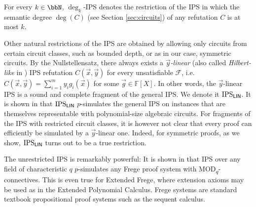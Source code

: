 \documentclass[10pt,a4paper]{article}
\newcommand{\Field}{\ensuremath{\mathbb{F}}}
\newcommand{\F}{\ensuremath{\mathcal{F}}}
\newcommand{\subsc}[1]{\textsubscript{#1}}
\newcommand{\IPSlin}{\text{\upshape IPS}_{\mathsf{LIN}}}
\begin{document}
	For every $k \in \bbN$, $\deg_k$-IPS denotes the restriction of the IPS 
	in which the semantic degree $\deg(C)$ (see Section \ref{sec:circuits}) of any refutation $C$ is at most $k$. %
	
	Other natural restrictions of the IPS are obtained by allowing only circuits from certain circuit classes, such as bounded depth, or as in our case, symmetric circuits.
	By the Nullstellensatz, there always exists a \textit{$\vec y$-linear} (also called 
	\textit{Hilbert-like} in \cite{IPS}) IPS refutation
	$C(\vec x, \vec y)$ for every unsatisfiable $\F$, i.e.\ 
	$
	C(\vec x, \vec y) = \sum_{i=1}^m y_i g_i(\vec x)
	$
	for some $\vec g \in \Field[X]$. In other words, the $\vec y$-linear IPS is a sound and complete fragment of the general IPS. We denote it $\IPSlin$.
	It is shown in \cite{IPS} that $\IPSlin$ $p$-simulates the general IPS on instances that are themselves representable with polynomial-size algebraic circuits. 
	For fragments of the IPS with restricted circuit classes, it is however not clear that every proof can efficiently be simulated by a $\vec y$-linear one. Indeed, for symmetric proofs, as we show, $\IPSlin$ turns out to be a true restriction. 

The unrestricted IPS is remarkably powerful: It is shown in \cite[Theorem 3.5]{IPS} that IPS over any field of characteristic $q$ $p$-simulates any Frege proof system with MOD\subsc{$q$}-connectives. This is even true for Extended Frege, where extension axioms may be used as in the Extended Polynomial Calculus. Frege systems are standard textbook propositional proof systems such as the sequent calculus.
	
	
\end{document}
